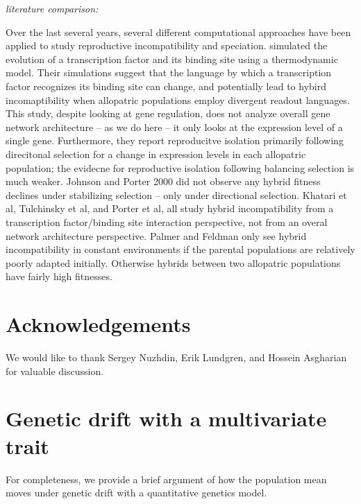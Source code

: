 \documentclass[9 pt]{article}
\newcommand{\jss}[1]{{\color{olive}\it #1}}
\newcommand{\1}{\mathbbm{1}}
\begin{document}
  \jss{literature comparison:}

  Over the last several years, several different computational approaches have been applied to study reproductive incompatibility and speciation. \citet{tulchinsky } simulated the evolution of a transcription factor and its binding site using a thermodynamic model. Their simulations suggest that the language by which a transcription factor recognizes its binding site can change, and potentially lead to hybird incomaptibility when allopatric populations employ divergent readout languages. This study, despite looking at gene regulation, does not analyze overall gene network architecture -- as we do here -- it only looks at the expression level of a single gene. Furthermore, they report reproducitve isolation primarily following direcitonal selection for a change in expression levels in each allopatric population; the evidecne for reproductive isolation following balancing selection is much weaker. Johnson and Porter 2000 did not observe any hybrid fitness declines under stabilizing selection -- only under directional selection. 
  Khatari et al, Tulchinsky et al, and Porter et al, all study hybrid incompatibility from a transcription factor/binding site interaction perspective, not from an overal network architecture perspective. Palmer and Feldman only see hybrid incompatibility in constant environments if the parental populations are relatively poorly adapted initially. Otherwise hybrids between two allopatric populations have fairly high fitnesses.  

\section*{Acknowledgements}
We would like to thank Sergey Nuzhdin, Erik Lundgren, and Hossein Asgharian for valuable discussion.




\normalsize
\appendix

\section{Genetic drift with a multivariate trait}
\label{ss:quant_gen}

For completeness, we provide a brief argument of how the population mean
moves under genetic drift
with a quantitative genetics model.
\end{document}
